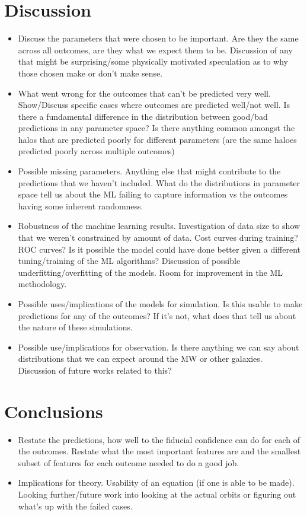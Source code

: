 \documentclass[fleqn,usenatbib]{mnras}
\begin{document}
\section{Discussion}
\begin{itemize}
	\item Discuss the parameters that were chosen to be important. Are they the same across all outcomes, are they what we expect them to be. Discussion of any that might be surprising/some physically motivated speculation as to why those chosen make or don't make sense.
    \item What went wrong for the outcomes that can't be predicted very well. Show/Discuss specific cases where outcomes are predicted well/not well. Is there a fundamental difference in the distribution between good/bad predictions in any parameter space? Is there anything common amongst the halos that are predicted poorly for different parameters (are the same haloes predicted poorly across multiple outcomes)
    \item Possible missing parameters. Anything else that might contribute to the predictions that we haven't included. What do the distributions in parameter space tell us about the ML failing to capture information vs the outcomes having some inherent randomness.
    \item Robustness of the machine learning results. Investigation of data size to show that we weren't constrained by amount of data. Cost curves during training? ROC curves? Is it possible the model could have done better given a different tuning/training of the ML algorithms? Discussion of possible underfitting/overfitting of the models. Room for improvement in the ML methodology.
    \item Possible uses/implications of the models for simulation. Is this usable to make predictions for any of the outcomes? If it's not, what does that tell us about the nature of these simulations.
    \item Possible use/implications for observation. Is there anything we can say about distributions that we can expect around the MW or other galaxies. Discussion of future works related to this?

\end{itemize}


\section{Conclusions}

\begin{itemize}
	\item Restate the predictions, how well to the fiducial confidence can do for each of the outcomes. Restate what the most important features are and the smallest subset of features for each outcome needed to do a good job.
	\item Implications for theory. Usability of an equation (if one is able to be made). Looking further/future work into looking at the actual orbits or figuring out what's up with the failed cases.
\end{itemize}
\end{document}
